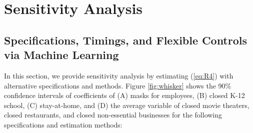 \documentclass[11pt,reqno,letter]{amsart}
\theoremstyle{definition}
\begin{document}
\section{Sensitivity Analysis}\label{sec:sensitivity}

\subsection{Specifications, Timings, and Flexible Controls via Machine Learning}
In this section, we provide sensitivity analysis by estimating (\ref{eq:R4}) with alternative specifications and methods. Figure \ref{fig:whisker} shows  the 90\% confidence intervals of   coefficients of (A) masks for employees, (B)  closed K-12 school, (C) stay-at-home, and (D) the average variable of  closed movie theaters, closed restaurants, and closed non-essential businesses for the following specifications and estimation methods:
\end{document}
